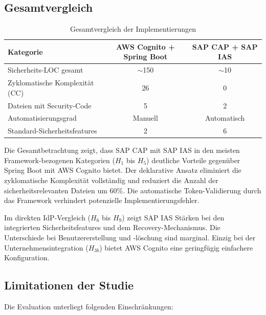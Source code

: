 \subsection{Gesamtvergleich}

\begin{table}[h]
    \centering
    \begin{tabular}{|l|c|c|}
        \hline
        \textbf{Kategorie} & \textbf{AWS Cognito + Spring Boot} & \textbf{SAP CAP + SAP IAS} \\
        \hline
        Sicherheits-LOC gesamt & $\sim$150 & $\sim$10 \\
        \hline
        Zyklomatische Komplexität (CC) & 26 & 0 \\
        \hline
        Dateien mit Security-Code  & 5 & 2 \\
        \hline
        Automatisierungsgrad & Manuell & Automatisch \\
        \hline
        Standard-Sicherheitsfeatures & 2 & 6 \\
        \hline
    \end{tabular}
    \caption{Gesamtvergleich der Implementierungen}
    \label{tab:gesamtvergleich}
\end{table}

Die Gesamtbetrachtung zeigt, dass \ac{SAP CAP} mit \ac{SAP IAS} in den meisten Framework-bezogenen Kategorien ($H_1$ bis $H_5$) deutliche Vorteile gegenüber Spring Boot mit \ac{AWS} Cognito bietet. Der deklarative Ansatz eliminiert die zyklomatische Komplexität vollständig und reduziert die Anzahl der sicherheitsrelevanten Dateien um 60\%. Die automatische Token-Validierung durch das Framework verhindert potenzielle Implementierungsfehler.

Im direkten \ac{IdP}-Vergleich ($H_6$ bis $H_9$) zeigt \ac{SAP IAS} Stärken bei den integrierten Sicherheitsfeatures und dem Recovery-Mechanismus. Die Unterschiede bei Benutzererstellung und -löschung sind marginal. Einzig bei der Unternehmensintegration ($H_{3b}$) bietet \ac{AWS} Cognito eine geringfügig einfachere Konfiguration.

\subsection{Limitationen der Studie}

Die Evaluation unterliegt folgenden Einschränkungen:

